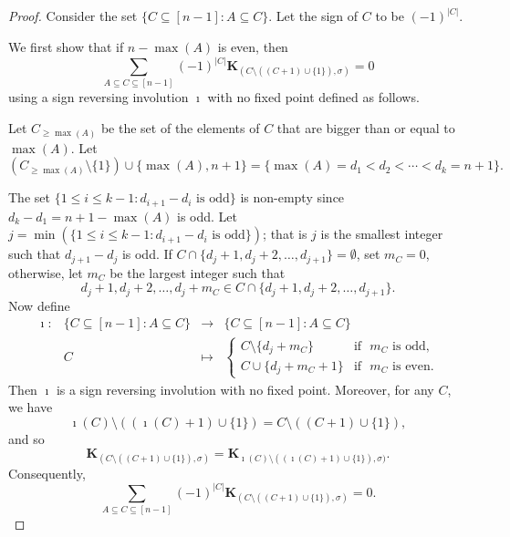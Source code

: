 \documentclass[11pt]{amsart}
\numberwithin{equation}{section}
\begin{document}
\begin{proof}

Consider the set $\{C\subseteq [n-1]: A\subseteq C\}$. Let the sign of $C$ to be $(-1)^{|C|}$. 

We first show that  if $n-\max(A)$ is even, then
$$\sum_{A\subseteq C\subseteq[n-1]}(-1)^{|C|}\mathbf{K}_{(C\setminus((C+1)\cup\{1\}),\sigma)}=0$$ using a sign reversing involution $\imath$ with no fixed point defined as follows. 

Let $C_{\geq \max(A)}$ be the set of the elements of $C$ that are bigger than or equal to $\max(A)$. Let 
$$(C_{\geq \max(A)}\setminus \{1\})\cup \{\max(A),n+1\}=\{\max(A)=d_1<d_2<\cdots<d_k=n+1\}.$$ 

The set $\{1\leq i\leq k-1: d_{i+1}-d_{i} \text{~is odd} \}$ is non-empty since $d_{k}-d_1=n+1-\max(A)$ is odd. Let $j=\min(\{1\leq i\leq k-1: d_{i+1}-d_{i} \text{~is odd}\})$; that is $j$  is the smallest integer such that $d_{j+1}-d_j$ is odd. If $ C\cap \{d_j+1, d_j+2,\dots, d_{j+1}\}=\emptyset$, set $m_C=0$, otherwise, let $m_C$ be the largest integer such that 
$$d_{j}+1,d_j+2,\ldots,d_j+m_C \in C\cap \{d_j+1, d_j+2,\dots, d_{j+1}\}.$$
Now define 
$$
\begin{array}{cccc}
\imath: & \{ C\subseteq [n-1]: A\subseteq C\}&\rightarrow &\{ C\subseteq [n-1]: A\subseteq C\}\\
& C& \mapsto & \begin{cases} 
C\setminus \{d_j+m_C\} & \text{if ~} m_C \text{~is odd,}\\
C\cup \{d_j+m_C+1\} & \text{if ~} m_C \text{~is even.}
\end{cases} 
\end{array}
$$
Then $\imath$ is a sign reversing involution with no fixed point. Moreover, for any $C$, we have
$$\imath(C)\setminus((\imath(C)+1)\cup\{1\})=C\setminus((C+1)\cup\{1\}),$$ and so 
$$\mathbf{K}_{(C\setminus((C+1)\cup\{1\}),\sigma)}=\mathbf{K}_{\imath(C)\setminus((\imath(C)+1)\cup\{1\}),\sigma)}.$$
Consequently, 
$$\sum_{A\subseteq C\subseteq[n-1]}(-1)^{|C|}\mathbf{K}_{(C\setminus((C+1)\cup\{1\}),\sigma)}=0.$$


\end{proof}
\end{document}

